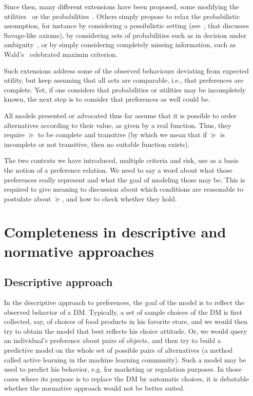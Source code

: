\documentclass[french, english]{llncs}
\begin{document}
	Since then, many different extensions have been proposed, some modifying the utilities~\citep{wakker_prospect_2010} or the probabilities~\citep{quiggin_generalized_2012}. Others simply propose to relax the probabilistic assumption, for instance by considering a possibilistic setting  (see~\cite{dubois_qualitative_2003}, that discusses Savage-like axioms), by considering sets of probabilities such as in decision under ambiguity~\cite{gajdos_attitude_2008}, or by simply considering completely missing information, such as Wald's~\cite{wald_statistical_1992} celebrated maximin criterion. 
	
	Such extensions address some of the observed behaviours deviating from expected utility, but keep assuming that all acts are comparable, i.e., that preferences are complete. Yet, if one considers that probabilities or utilities may be incompletely known, the next step is to consider that preferences as well could be.
	
	All models presented or advocated thus far assume that it is possible to order alternatives according to their value, as given by a real function. Thus, they require $\succeq$ to be complete and transitive (by which we mean that if $\succeq$ is incomplete or not transitive, then no suitable function exists).
	
	The two contexts we have introduced, multiple criteria and risk, use as a basis the notion of a preference relation. We need to say a word about what those preferences really represent and what the goal of modeling those may be. This is required to give meaning to discussion about which conditions are reasonable to postulate about $\succeq$, and how to check whether they hold.
	
	\section{Completeness in descriptive and normative approaches}\label{sec:nordesc}
	\subsection{Descriptive approach}
	In the descriptive approach to preferences, the goal of the model is to reflect the observed behavior of a \ac{DM}. Typically, a set of sample choices of the \ac{DM} is first collected, say, of choices of food products in his favorite store, and we would then try to obtain the model that best reflects his choice attitude. Or, we would query an individual’s preference about pairs of objects, and then try to build a predictive model on the whole set of possible pairs of alternatives (a method called active learning in the machine learning community). Such a model may be used to predict his behavior, e.g. for marketing or regulation purposes. In those cases where its purpose is to replace the \ac{DM} by automatic choices, it is debatable whether the normative approach would not be better suited.
	
\end{document}
